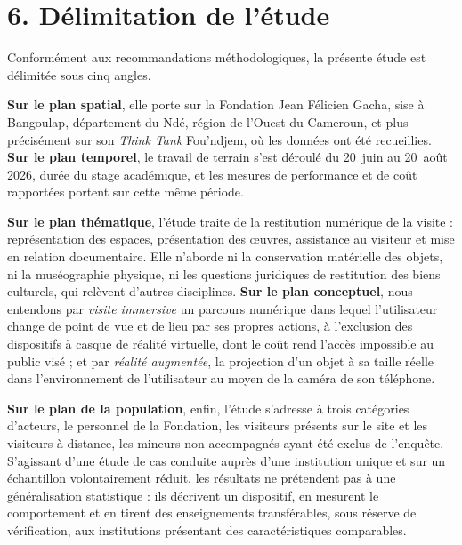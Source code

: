 \section*{6. Délimitation de l'étude}

Conformément aux recommandations méthodologiques, la présente étude est
délimitée sous cinq angles.

\textbf{Sur le plan spatial}, elle porte sur la Fondation Jean Félicien Gacha,
sise à Bangoulap, département du Ndé, région de l'Ouest du Cameroun, et plus
précisément sur son \emph{Think Tank} Fou'ndjem, où les données ont été
recueillies. \textbf{Sur le plan temporel}, le travail de terrain s'est déroulé
du 20~juin au 20~août 2026, durée du stage académique, et les mesures de
performance et de coût rapportées portent sur cette même période.

\textbf{Sur le plan thématique}, l'étude traite de la restitution numérique de
la visite : représentation des espaces, présentation des œuvres, assistance au
visiteur et mise en relation documentaire. Elle n'aborde ni la conservation
matérielle des objets, ni la muséographie physique, ni les questions juridiques
de restitution des biens culturels, qui relèvent d'autres disciplines.
\textbf{Sur le plan conceptuel}, nous entendons par \emph{visite immersive} un
parcours numérique dans lequel l'utilisateur change de point de vue et de lieu
par ses propres actions, à l'exclusion des dispositifs à casque de réalité
virtuelle, dont le coût rend l'accès impossible au public visé ; et par
\emph{réalité augmentée}, la projection d'un objet à sa taille réelle dans
l'environnement de l'utilisateur au moyen de la caméra de son téléphone.

\textbf{Sur le plan de la population}, enfin, l'étude s'adresse à trois
catégories d'acteurs, le personnel de la Fondation, les visiteurs présents sur
le site et les visiteurs à distance, les mineurs non accompagnés ayant été
exclus de l'enquête. S'agissant d'une étude de cas conduite auprès d'une
institution unique et sur un échantillon volontairement réduit, les résultats ne
prétendent pas à une généralisation statistique : ils décrivent un dispositif,
en mesurent le comportement et en tirent des enseignements transférables, sous
réserve de vérification, aux institutions présentant des caractéristiques
comparables.

